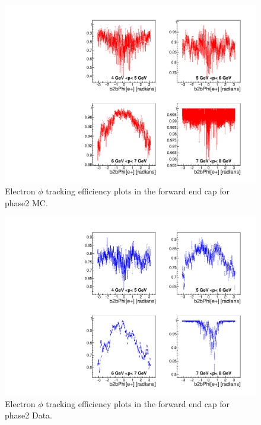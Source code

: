 \documentclass[a4paper,11pt,twosided,final,german,openbib,pdftex,listof=totoc,bibliography=totoc]{scrbook}
\begin{document}
\begin{appendix}
\begin{figure}[!htbp]
	\centering
	\includegraphics[width=\textwidth]{Plots/master/xPMPhiemFC_MC}
	\caption[Momentum $\phi$ Electron Forward End Cap Efficiency Phase2 MC]{Electron $\phi$ tracking efficiency plots in the forward end cap for phase2 MC.}
	\label{plt:PMPhiemFC_MC}
\end{figure}


\begin{figure}[!htbp]
	\centering
	\includegraphics[width=\textwidth]{Plots/master/xPMPhiemFC_Data}
	\caption[Momentum $\phi$ Electron Forward End Cap Efficiency Phase2 Data]{Electron $\phi$ tracking efficiency plots in the forward end cap for phase2 Data.}
	\label{plt:PMPhiemFC_Data}
\end{figure}









\end{appendix}
\end{document}
